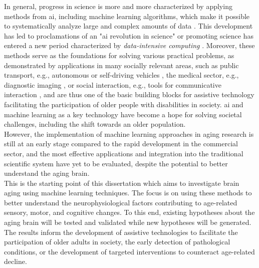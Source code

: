 In general, progress in science is more and more characterized by applying methods from \gls{ai}, including machine learning algorithms, which make it possible to systematically analyze large and complex amounts of data \cite{Brunton2019}. This development has led to proclamations of an "\gls{ai} revolution in science" \cite{Appenzeller2017} or promoting science has entered a new period characterized by \textit{data-intensive computing} \cite{Hey2009}. Moreover, these methods serve as the foundations for solving various practical problems, as demonstrated by applications in many socially relevant areas, such as public transport, e.g., autonomous or self-driving vehicles \cite{Leonard2020}, the medical sector, e.g., diagnostic imaging \cite{Liu2020}, or social interaction, e.g., tools for communicative interaction \cite{Adamopoulou2020}, and are thus one of the basic building blocks for assistive technology facilitating the participation of older people with disabilities in society. \Gls{ai} and machine learning as a key technology have become a hope for solving societal challenges, including the shift towards an older population.\\
However, the implementation of machine learning approaches in aging research is still at an early stage compared to the rapid development in the commercial sector, and the most effective applications and integration into the traditional scientific system have yet to be evaluated, despite the potential to better understand the aging brain.\\
This is the starting point of this dissertation which aims to investigate brain aging using machine learning techniques. The focus is on using these methods to better understand the neurophysiological factors contributing to age-related sensory, motor, and cognitive changes. To this end, existing hypotheses about the aging brain will be tested and validated while new hypotheses will be generated. The results inform the development of assistive technologies to facilitate the participation of older adults in society, the early detection of pathological conditions, or the development of targeted interventions to counteract age-related decline.


